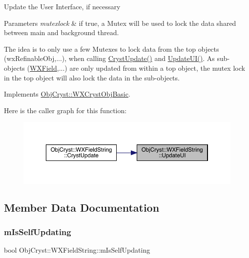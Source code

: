 Update the User Interface, if necessary


\begin{DoxyParams}{Parameters}
{\em mutexlock} & if true, a Mutex will be used to lock the data shared between main and background thread.\\
\hline
\end{DoxyParams}
The idea is to only use a few Mutexes to lock data from the top objects (wx\+Refinable\+Obj,...), when calling \mbox{\hyperlink{class_obj_cryst_1_1_w_x_field_string_acac0d32e4560531e1cab6af0071bb55f}{Cryst\+Update()}} and \mbox{\hyperlink{class_obj_cryst_1_1_w_x_field_string_ae5d38d52534a9ccbc0f9c030fc447332}{Update\+U\+I()}}. As sub-\/objects (\mbox{\hyperlink{class_obj_cryst_1_1_w_x_field}{W\+X\+Field}},...) are only updated from within a top object, the mutex lock in the top object will also lock the data in the sub-\/objects. 

Implements \mbox{\hyperlink{class_obj_cryst_1_1_w_x_cryst_obj_basic_a3818940b7031ff7e45cf2178c4a99c90}{Obj\+Cryst\+::\+W\+X\+Cryst\+Obj\+Basic}}.

Here is the caller graph for this function\+:
\nopagebreak
\begin{figure}[H]
\begin{center}
\leavevmode
\includegraphics[width=350pt]{class_obj_cryst_1_1_w_x_field_string_ae5d38d52534a9ccbc0f9c030fc447332_icgraph}
\end{center}
\end{figure}


\subsection{Member Data Documentation}
\mbox{\label{class_obj_cryst_1_1_w_x_field_string_aa22ef2e61af183c448dabe73b98d367e}} 
\subsubsection{\texorpdfstring{mIsSelfUpdating}{mIsSelfUpdating}}
{\footnotesize\ttfamily bool Obj\+Cryst\+::\+W\+X\+Field\+String\+::m\+Is\+Self\+Updating\hspace{0.3cm}{\ttfamily [protected]}}

